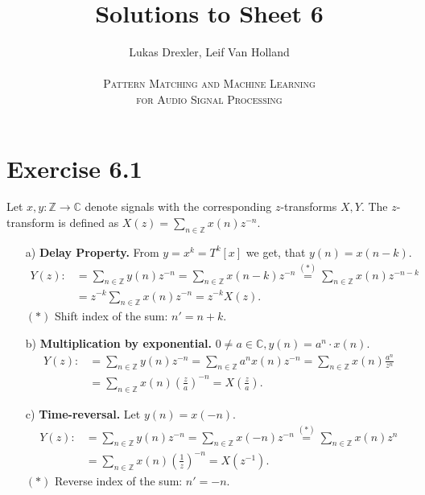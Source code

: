 \documentclass[12pt]{article}
\begin{document}
\title{Solutions to Sheet 6}
\author{Lukas Drexler, Leif Van Holland \\ \\
\textsc{Pattern Matching and Machine Learning} \\
\textsc{for Audio Signal Processing}}
\maketitle

\section*{Exercise 6.1}
Let $x,y:\mathbb{Z}\to\mathbb{C}$ denote signals with the corresponding $z$-transforms $X,Y$. The $z$-transform is defined as $X(z)=\sum_{n\in\mathbb{Z}}x(n)z^{-n}$.
\begin{itemize}
    \item [a)] \textbf{Delay Property.} From $y=x^k=T^k[x]$ we get, that $y(n)=x(n-k)$.
    \begin{align*}
        Y(z):&=\sum_{n\in\mathbb{Z}}y(n)z^{-n}
        =\sum_{n\in\mathbb{Z}}x(n-k)z^{-n}
        \overset{(*)}{=}\sum_{n\in\mathbb{Z}}x(n)z^{-n-k}\\
        &=z^{-k}\sum_{n\in\mathbb{Z}}x(n)z^{-n}
        =z^{-k}X(z).
    \end{align*}
    ${\scriptstyle(*)}$ Shift index of the sum: $n'=n+k$.
    
    \item [b)] \textbf{Multiplication by exponential.} $0\neq a\in\mathbb{C}, y(n)=a^n\cdot x(n)$.
    \begin{align*}
        Y(z):&=\sum_{n\in\mathbb{Z}}y(n)z^{-n}
        =\sum_{n\in\mathbb{Z}}a^n x(n) z^{-n}
        =\sum_{n\in\mathbb{Z}}x(n)\frac{a^n}{z^n}\\
        &=\sum_{n\in\mathbb{Z}}x(n)\left(\frac{z}{a}\right)^{-n}
        =X\left(\frac{z}{a}\right).
    \end{align*}
    
    \item [c)] \textbf{Time-reversal.} Let $y(n)=x(-n)$.
    \begin{align*}
        Y(z):&=\sum_{n\in\mathbb{Z}}y(n)z^{-n}
        =\sum_{n\in\mathbb{Z}}x(-n)z^{-n}
        \overset{(*)}{=}\sum_{n\in\mathbb{Z}}x(n)z^n\\
        &=\sum_{n\in\mathbb{Z}}x(n)\left(\frac{1}{z}\right)^{-n}=X(z^{-1}).
    \end{align*}
    ${\scriptstyle(*)}$ Reverse index of the sum: $n'=-n$.
    

\end{itemize}
\end{document}
